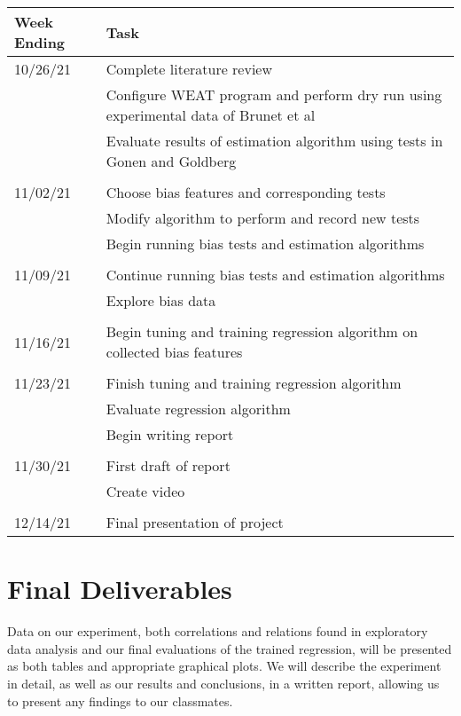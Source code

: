 \documentclass{article}
\begin{document}
\begin{tabular}{p{1in}|p{\dimexpr\linewidth-1in-4\tabcolsep}}
    \hline
    \textbf{Week Ending} & \textbf{Task} \\
    \hline
    10/26/21 & Complete literature review \\
             & Configure WEAT program and perform dry run using
             experimental data of Brunet et
             al\cite{brunet_understanding_2019} \\
             & Evaluate results of estimation algorithm using tests in
             Gonen and Goldberg\cite{gonen_lipstick_2019} \\
             &\\
    11/02/21 & Choose bias features and corresponding tests \\
             & Modify algorithm to perform and record new tests \\
             & Begin running bias tests and estimation algorithms \\
             &\\
    11/09/21 & Continue running bias tests and estimation algorithms \\
             & Explore bias data \\
             &\\
    11/16/21 & Begin tuning and training regression algorithm on
    collected bias features \\
             &\\
    11/23/21 & Finish tuning and training regression algorithm \\
             & Evaluate regression algorithm \\
             & Begin writing report \\
             &\\
    11/30/21 & First draft of report \\
             & Create video \\
             &\\
    12/14/21 & Final presentation of project \\
    \hline
\end{tabular}

    

\section{Final Deliverables}

Data on our experiment, both correlations and relations found in
exploratory data analysis and our final evaluations of the trained
regression, will be presented as both tables and appropriate graphical
plots. We will describe the experiment in detail, as well as our results
and conclusions, in a written report, allowing us to present any
findings to our classmates.
\end{document}
